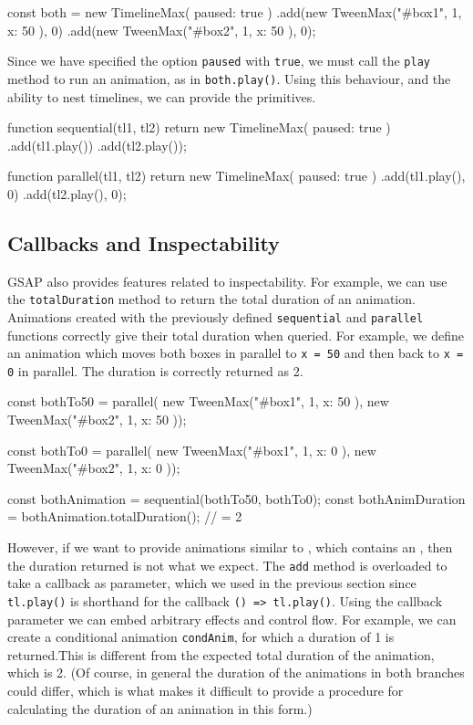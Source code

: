 \begin{js}
const both = new TimelineMax({ paused: true })
  .add(new TweenMax("#box1", 1, { x: 50 }), 0)
  .add(new TweenMax("#box2", 1, { x: 50 }), 0);
\end{js}

Since we have specified the option \texttt{paused} with \texttt{true}, we must
call the \texttt{play} method to run an animation, as in
\texttt{both.play()}. Using this behaviour, and the ability to nest timelines,
we can provide the \dsl{} primitives.

\begin{js}
function sequential(tl1, tl2) {
  return new TimelineMax({ paused: true })
    .add(tl1.play())
    .add(tl2.play()); }

function parallel(tl1, tl2) {
  return new TimelineMax({ paused: true })
    .add(tl1.play(), 0)
    .add(tl2.play(), 0); }
\end{js}

\subsection{Callbacks and Inspectability}

GSAP also provides features related to inspectability. For example, we can use the
\texttt{totalDuration} method to return the total duration of an animation.
Animations created with the previously defined \texttt{sequential} and
\texttt{parallel} functions correctly give their total duration when queried.
For example, we define an animation which moves both boxes in parallel to
\texttt{x = 50} and then back to \texttt{x = 0} in parallel. The duration is
correctly returned as 2.

\begin{js}
const bothTo50 = parallel(
  new TweenMax("#box1", 1, { x: 50 }),
  new TweenMax("#box2", 1, { x: 50 }));

const bothTo0 = parallel(
  new TweenMax("#box1", 1, { x: 0 }),
  new TweenMax("#box2", 1, { x: 0 }));

const bothAnimation = sequential(bothTo50, bothTo0);
const bothAnimDuration = bothAnimation.totalDuration(); // = 2
\end{js}

However, if we want to provide animations similar to , which contains an , then the duration returned is not what we expect. The \texttt{add} method is overloaded to take a callback as parameter, which we used in the previous section since \texttt{tl.play()} is shorthand for the callback \texttt{() => tl.play()}. Using the callback parameter we can embed arbitrary effects and control flow. For example, we can create a conditional animation \texttt{condAnim}, for which a duration of 1 is returned.This is different from the expected total duration of the animation, which is 2. (Of course, in general the duration of the animations in both branches could differ, which is what makes it difficult to provide a procedure for calculating the duration of an animation in this form.)

